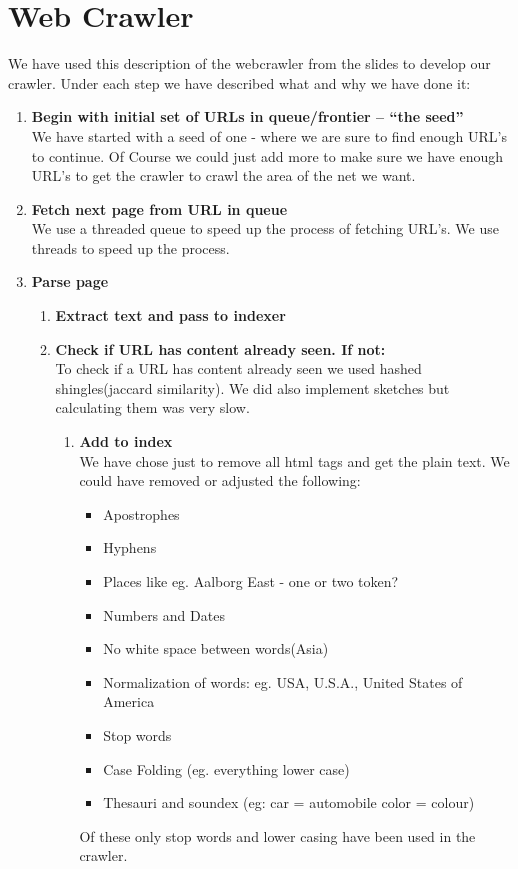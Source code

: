 \chapter{Web Crawler}
We have used this description of the webcrawler from the slides to develop our crawler. Under each step we have described what and why we have done it:

\begin{enumerate}[label=\textbf{\arabic*.}]
	\item \textbf{Begin with initial set of URLs in queue/frontier – “the seed”}\\
	We have started with a seed of one - where we are sure to find enough URL's to continue.
	Of Course we could just add more to make sure we have enough URL's to get the crawler to crawl the area of the net we want.
	
	\item \textbf{Fetch next page from URL in queue}\\
	We use a threaded queue to speed up the process of fetching URL's.
	We use threads to speed up the process.
	
	\item \textbf{Parse page}
	\begin{enumerate}[label=\textbf{\alph*)}]
		\item \textbf{Extract text and pass to indexer}
		\item \textbf{Check if URL has content already seen. If not:}\\
		To check if a URL has content already seen we used hashed shingles(jaccard similarity).
		We did also implement sketches but calculating them was very slow.
		
		\begin{enumerate}[label=\textbf{\roman*.}]
			\item \textbf{Add to index}\\
			We have chose just to remove all html tags and get the plain text.
			We could have removed or adjusted the following:
			\begin{itemize}
			\item Apostrophes
			\item Hyphens
			\item Places like eg. Aalborg East - one or two token?
			\item Numbers and Dates
			\item No white space between words(Asia)
			\item Normalization of words: eg. USA, U.S.A., United States of America
			\item Stop words
			\item Case Folding (eg. everything lower case)
			\item Thesauri and soundex (eg: car = automobile color = colour)
			\end{itemize}
			Of these only stop words and lower casing have been used in the crawler.
			

\end{enumerate}
\end{enumerate}
\end{enumerate}

